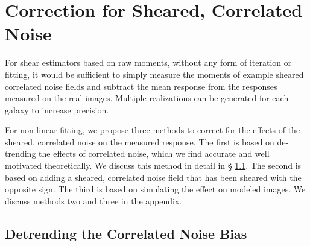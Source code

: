 \documentclass[usegraphicx,usenatbib]{mn2e}
\begin{document}
\section{Correction for Sheared, Correlated Noise} \label{sec:corr}

For shear estimators based on raw moments, without any form of iteration or
fitting, it would be sufficient to simply measure the moments of example
sheared correlated noise fields and subtract the mean response from the
responses measured on the real images.  Multiple realizations can be generated
for each galaxy to increase precision.

For non-linear fitting, we propose three methods to correct for the effects of
the sheared, correlated noise on the measured response.  The first is based on
de-trending the effects of correlated noise, which we find accurate and well
motivated theoretically.  We discuss this method in detail in \S
\ref{sec:detrend}.  The second is based on adding a sheared, correlated noise
field that has been sheared with the opposite sign.  The third is based on
simulating the effect on modeled images.  We discuss methods two and three in
the appendix.


\subsection{Detrending the Correlated Noise Bias} \label{sec:detrend}
\end{document}

